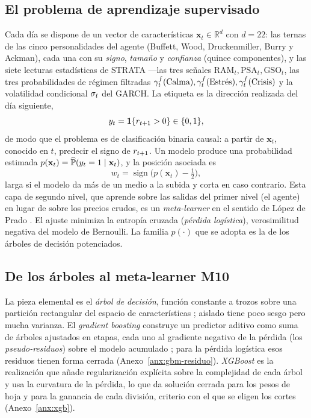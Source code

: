 \subsection{El problema de aprendizaje supervisado}
\label{sec:sup-problema}

Cada día se dispone de un vector de características $\mathbf{x}_t \in \mathbb{R}^{d}$ con $d = 22$: las ternas de las cinco personalidades del agente (Buffett, Wood, Druckenmiller, Burry y Ackman), cada una con su \emph{signo}, \emph{tamaño} y \emph{confianza} (quince componentes), y las siete lecturas estadísticas de STRATA —las tres señales $\mathrm{RAM}_t, \mathrm{PSA}_t, \mathrm{GSO}_t$, las tres probabilidades de régimen filtradas $\gamma^{f}_t(\text{Calma}), \gamma^{f}_t(\text{Estrés}), \gamma^{f}_t(\text{Crisis})$ y la volatilidad condicional $\sigma_t$ del GARCH. La etiqueta es la dirección realizada del día siguiente,
\[
y_t = \mathbf{1}\{r_{t+1} > 0\} \in \{0, 1\},
\]
de modo que el problema es de clasificación binaria causal: a partir de $\mathbf{x}_t$, conocido en $t$, predecir el signo de $r_{t+1}$. Un modelo produce una probabilidad estimada $p(\mathbf{x}_t) = \widehat{\mathbb{P}}(y_t = 1 \mid \mathbf{x}_t)$, y la posición asociada es
\[
w_t = \operatorname{sign}\!\big(p(\mathbf{x}_t) - \tfrac{1}{2}\big),
\]
larga si el modelo da más de un medio a la subida y corta en caso contrario. Esta capa de segundo nivel, que aprende sobre las salidas del primer nivel (el agente) en lugar de sobre los precios crudos, es un \emph{meta-learner} en el sentido de López de Prado \cite{lopezdeprado2018}. El ajuste minimiza la entropía cruzada (\emph{pérdida logística}), verosimilitud negativa del modelo de Bernoulli. La familia $p(\cdot)$ que se adopta es la de los árboles de decisión potenciados.

\subsection{De los árboles al meta-learner M10}
\label{sec:sup-arboles}
\label{sec:sup-gbm}
\label{sec:sup-xgboost}

La pieza elemental es el \emph{árbol de decisión}, función constante a trozos sobre una partición rectangular del espacio de características \cite{hastie2009}; aislado tiene poco sesgo pero mucha varianza. El \emph{gradient boosting} construye un predictor aditivo como suma de árboles ajustados en etapas, cada uno al gradiente negativo de la pérdida (los \emph{pseudo-residuos}) sobre el modelo acumulado \cite{friedman2001}; para la pérdida logística esos residuos tienen forma cerrada (Anexo~\ref{anx:gbm-residuo}). \emph{XGBoost} es la realización que añade regularización explícita sobre la complejidad de cada árbol y usa la curvatura de la pérdida, lo que da solución cerrada para los pesos de hoja y para la ganancia de cada división, criterio con el que se eligen los cortes \cite{chen2016} (Anexo~\ref{anx:xgb}).

